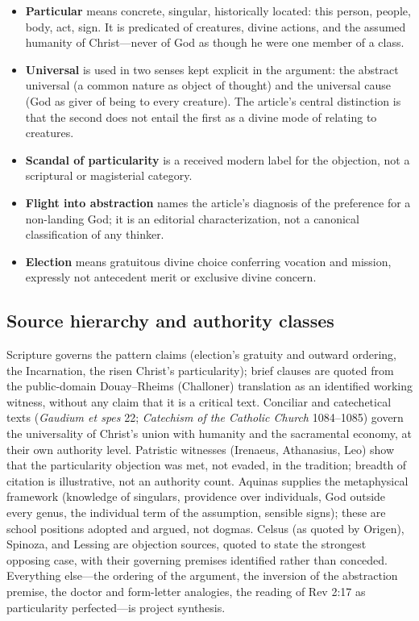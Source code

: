 \begin{itemize}
\item \textbf{Particular} means concrete, singular, historically located: this person, people, body, act, sign. It is predicated of creatures, divine actions, and the assumed humanity of Christ---never of God as though he were one member of a class.
\item \textbf{Universal} is used in two senses kept explicit in the argument: the abstract universal (a common nature as object of thought) and the universal cause (God as giver of being to every creature). The article's central distinction is that the second does not entail the first as a divine mode of relating to creatures.
\item \textbf{Scandal of particularity} is a received modern label for the objection, not a scriptural or magisterial category.
\item \textbf{Flight into abstraction} names the article's diagnosis of the preference for a non-landing God; it is an editorial characterization, not a canonical classification of any thinker.
\item \textbf{Election} means gratuitous divine choice conferring vocation and mission, expressly not antecedent merit or exclusive divine concern.
\end{itemize}

\subsection{Source hierarchy and authority classes}

Scripture governs the pattern claims (election's gratuity and outward ordering, the Incarnation, the risen Christ's particularity); brief clauses are quoted from the public-domain Douay--Rheims (Challoner) translation as an identified working witness, without any claim that it is a critical text. Conciliar and catechetical texts (\emph{Gaudium et spes} 22; \emph{Catechism of the Catholic Church} 1084--1085) govern the universality of Christ's union with humanity and the sacramental economy, at their own authority level. Patristic witnesses (Irenaeus, Athanasius, Leo) show that the particularity objection was met, not evaded, in the tradition; breadth of citation is illustrative, not an authority count. Aquinas supplies the metaphysical framework (knowledge of singulars, providence over individuals, God outside every genus, the individual term of the assumption, sensible signs); these are school positions adopted and argued, not dogmas. Celsus (as quoted by Origen), Spinoza, and Lessing are objection sources, quoted to state the strongest opposing case, with their governing premises identified rather than conceded. Everything else---the ordering of the argument, the inversion of the abstraction premise, the doctor and form-letter analogies, the reading of Rev 2:17 as particularity perfected---is project synthesis.

